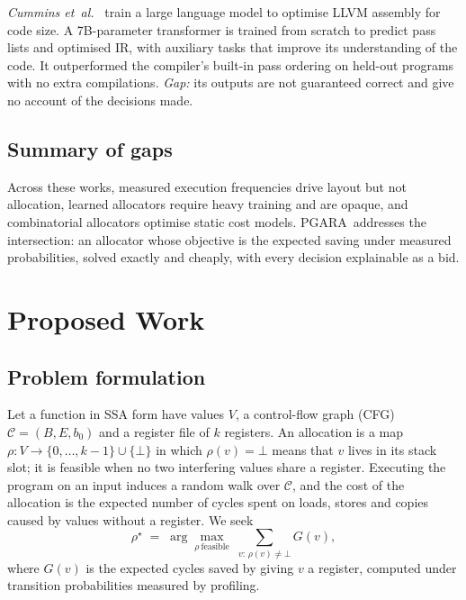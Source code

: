 \documentclass[conference]{IEEEtran}
\newcommand{\MG}{PGARA}
\begin{document}
\textit{Cummins et~al.}~\cite{cummins2023llm} train a large language
model to optimise LLVM assembly for code size. A 7B-parameter
transformer is trained from scratch to predict pass lists and optimised
IR, with auxiliary tasks that improve its understanding of the code.
It outperformed the compiler's built-in pass ordering on held-out
programs with no extra compilations. \textit{Gap:} its outputs are not
guaranteed correct and give no account of the decisions made.

\subsection{Summary of gaps}

Across these works, measured execution frequencies drive layout but not
allocation, learned allocators require heavy training and are opaque,
and combinatorial allocators optimise static cost models. \MG\
addresses the intersection: an allocator whose objective is the
expected saving under measured probabilities, solved exactly and
cheaply, with every decision explainable as a bid.

\section{Proposed Work}
\label{sec:proposed}

\subsection{Problem formulation}

Let a function in SSA form have values $V$, a control-flow graph (CFG)
$\mathcal{C}=(B,E,b_0)$ and a register file of $k$ registers. An
allocation is a map $\rho: V \to \{0,\dots,k{-}1\}\cup\{\bot\}$ in which
$\rho(v)=\bot$ means that $v$ lives in its stack slot; it is feasible
when no two interfering values share a register. Executing the program
on an input induces a random walk over $\mathcal{C}$, and the cost of
the allocation is the expected number of cycles spent on loads, stores
and copies caused by values without a register. We seek
\begin{equation}
\rho^\star \;=\; \arg\max_{\rho\ \text{feasible}}\;
\sum_{v:\,\rho(v)\neq\bot} G(v),
\label{eq:objective}
\end{equation}
where $G(v)$ is the expected cycles saved by giving $v$ a register,
computed under transition probabilities measured by profiling.
\end{document}
